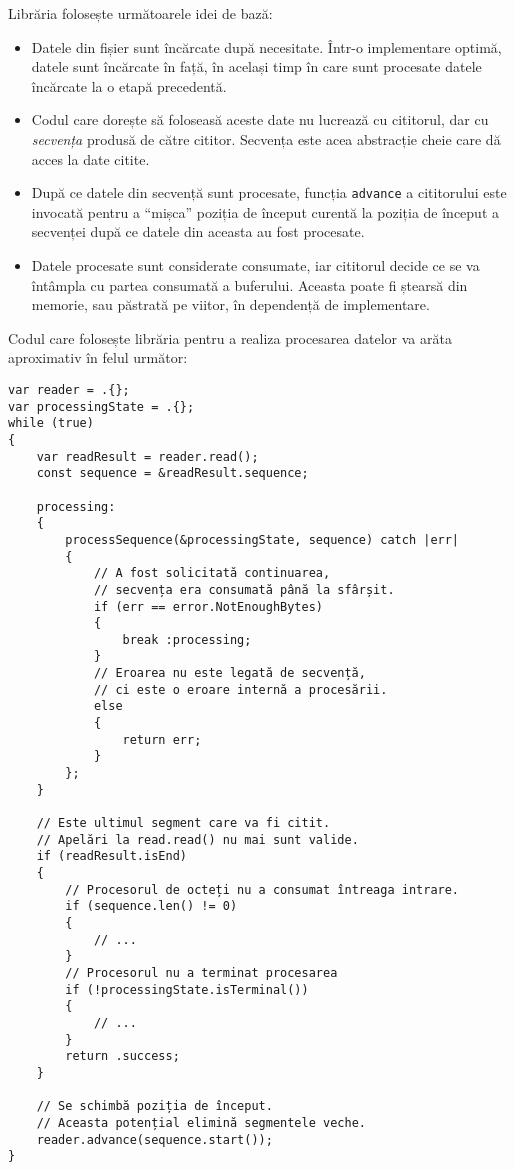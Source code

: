 \documentclass[a4paper,12pt]{report}
\begin{document}
Librăria folosește următoarele idei de bază:
\begin{itemize}
    \item 
        Datele din fișier sunt încărcate după necesitate.
        Într-o implementare optimă, datele sunt încărcate în față, în același timp în care sunt procesate
        datele încărcate la o etapă precedentă.

    \item
        Codul care dorește să foloseasă aceste date nu lucrează cu cititorul,
        dar cu \textit{secvența} produsă de către cititor.
        Secvența este acea abstracție cheie care dă acces la date citite.

    \item
        După ce datele din secvență sunt procesate,
        funcția \texttt{advance} a cititorului este invocată pentru
        a ``mișca'' poziția de început curentă la poziția de început 
        a secvenței după ce datele din aceasta au fost procesate.

    \item
        Datele procesate sunt considerate consumate,
        iar cititorul decide ce se va întâmpla cu partea consumată a buferului.
        Aceasta poate fi ștearsă din memorie, sau păstrată pe viitor, în dependență de implementare.
\end{itemize}

Codul care folosește librăria pentru a realiza procesarea datelor
va arăta aproximativ în felul următor:

\begin{verbatim}
var reader = .{};
var processingState = .{};
while (true)
{
    var readResult = reader.read();
    const sequence = &readResult.sequence;

    processing:
    {
        processSequence(&processingState, sequence) catch |err|
        {
            // A fost solicitată continuarea,
            // secvența era consumată până la sfârșit.
            if (err == error.NotEnoughBytes)
            {
                break :processing;
            }
            // Eroarea nu este legată de secvență,
            // ci este o eroare internă a procesării.
            else
            {
                return err;
            }
        };
    }

    // Este ultimul segment care va fi citit.
    // Apelări la read.read() nu mai sunt valide.
    if (readResult.isEnd)
    {
        // Procesorul de octeți nu a consumat întreaga intrare.
        if (sequence.len() != 0)
        {
            // ...
        }
        // Procesorul nu a terminat procesarea
        if (!processingState.isTerminal())
        {
            // ...
        }
        return .success;
    }

    // Se schimbă poziția de început.
    // Aceasta potențial elimină segmentele veche.
    reader.advance(sequence.start());
}
\end{verbatim}
\end{document}
